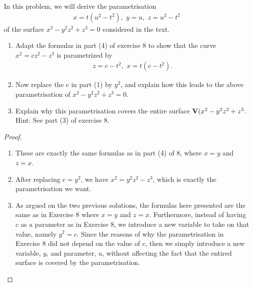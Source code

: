 \begin{exercise}{11}
In this problem, we will derive the parametrisation
\begin{align*}
    x = t(u^2-t^2),\,\, y = u,\,\, z = u^2-t^2
\end{align*}
of the surface $x^2-y^2z^2+z^3=0$ considered in the text.
\begin{enumerate}
    \item Adapt the formulas in part (4) of exercise 8 to show that the curve $x^2 = cz^2-z^3$ is parametrized by 
    \begin{align*}
        z=c-t^2,\,\, x=t(c-t^2).
    \end{align*}
    \item Now replace the c in part (1) by $y^2$, and explain how this leads to the above parametrisation of $x^2-y^2z^2+z^3=0$.
    \item Explain why this parametrisation covers the entire surface $\mathbf{V}(x^2-y^2z^2+z^3$. Hint: See part (3) of exercise 8.
\end{enumerate}
\end{exercise}
\begin{proof}
\begin{enumerate}
    \item These are exactly the same formulas as in part (4) of 8, where $x=y$ and $z=x$. 
    \item After replacing $c=y^2$, we have $x^2=y^2z^2-z^3$, which is exactly the parametrisation we want.
    \item As argued on the two previous solutions, the formulas here presented are the same as in Exercise 8 where $x=y$ and $z=x$. Furthermore, instead of having $c$ as a parameter as in Exercise 8, we introduce a new variable to take on that value, namely $y^2=c$. Since the reasons of why the parametrisation in Exercise 8 did not depend on the value of $c$, then we simply introduce a new variable, $y$, and parameter, $u$, without affecting the fact that the entired surface is covered by the parametrisation.
\end{enumerate}
\end{proof}
